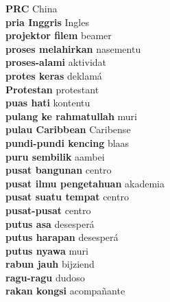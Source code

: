 \textbf{ PRC  } China \\
\textbf{ pria Inggris  } Ingles \\
\textbf{ projektor filem  } beamer \\
\textbf{ proses melahirkan  } nasementu \\
\textbf{ proses-alami  } aktividat \\
\textbf{ protes keras  } deklamá \\
\textbf{ Protestan  } protestant \\
\textbf{ puas hati  } kontentu \\
\textbf{ pulang ke rahmatullah  } muri \\
\textbf{ pulau Caribbean  } Caribense \\
\textbf{ pundi-pundi kencing  } blaas \\
\textbf{ puru sembilik  } aambei \\
\textbf{ pusat bangunan  } centro \\
\textbf{ pusat ilmu pengetahuan  } akademia \\
\textbf{ pusat suatu tempat  } centro \\
\textbf{ pusat-pusat  } centro \\
\textbf{ putus asa  } desesperá \\
\textbf{ putus harapan  } desesperá \\
\textbf{ putus nyawa  } muri \\
\textbf{ rabun jauh  } bijziend \\
\textbf{ ragu-ragu  } dudoso \\
\textbf{ rakan kongsi  } acompañante \\
